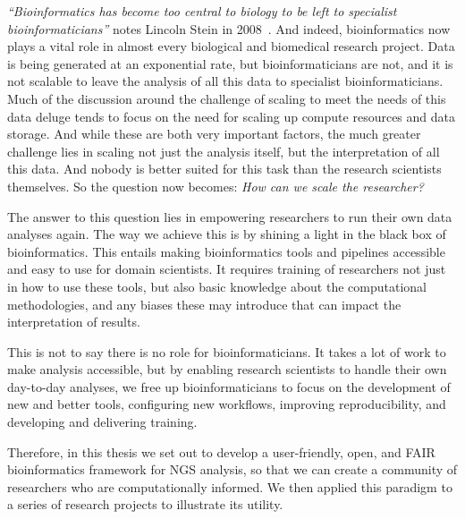 \emph{``Bioinformatics has become too central to biology to be left to specialist bioinformaticians''} notes Lincoln Stein in 2008~\cite{stein2008bioinformatics}.
And indeed, bioinformatics now plays a vital role in almost every biological and biomedical research project.
Data is being generated at an exponential rate, but bioinformaticians are not,  and it is not scalable to leave the analysis of all this data to specialist bioinformaticians.
Much of the discussion around the challenge of scaling to meet the needs of this data deluge tends to focus on the need for scaling up compute resources and data storage.
And while these are both very important factors, the much greater challenge lies in scaling not just the analysis itself, but the interpretation of all this data.
And nobody is better suited for this task than the research scientists themselves. So the question now becomes: \emph{How can we scale the researcher?}

The answer to this question lies in empowering researchers to run their own data analyses again.
The way we achieve this is by shining a light in the black box of bioinformatics.
This entails making bioinformatics tools and pipelines accessible and easy to use for domain scientists.
It requires training of researchers not just in how to use these tools, but also basic knowledge about the computational methodologies, and any biases these may introduce that can impact the interpretation of results.

This is not to say there is no role for bioinformaticians.
It takes a lot of work to make analysis accessible, but by enabling research scientists to handle their own day-to-day analyses, we free up bioinformaticians to focus on the development of new and better tools, configuring new workflows, improving reproducibility, and developing and delivering training.

Therefore, in this thesis we set out to develop a user-friendly, open, and FAIR bioinformatics framework for NGS analysis, so that we can create a community of researchers who are computationally informed.
We then applied this paradigm to a series of research projects to illustrate its utility.



